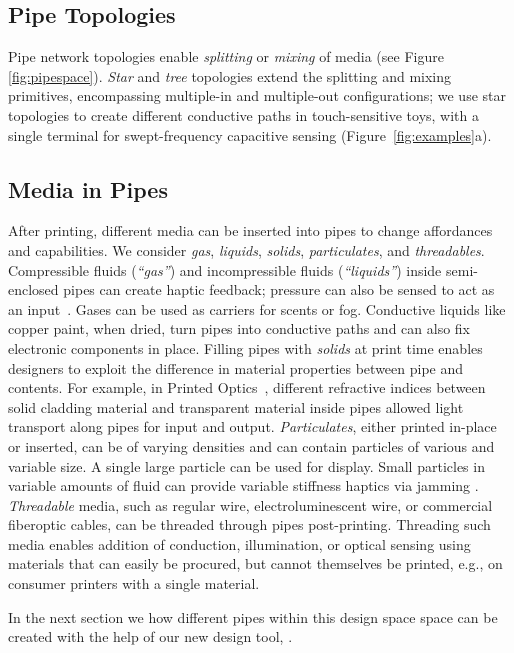 \subsection{Pipe Topologies}
Pipe network topologies enable \emph{splitting} or \emph{mixing} of media (see Figure \ref{fig:pipespace}).  \emph{Star} and \emph{tree} topologies extend the splitting and mixing primitives, encompassing multiple-in and multiple-out configurations; we use star topologies to create different conductive paths in touch-sensitive toys, with a single terminal for swept-frequency capacitive sensing (Figure~\ref{fig:examples}a).

\subsection{Media in Pipes}
After printing, different media can be inserted into pipes to change affordances and capabilities. We consider \emph{gas}, \emph{liquids}, \emph{solids}, \emph{particulates}, and \emph{threadables}. 
%
Compressible fluids (\emph{``gas''}) and incompressible fluids (\emph{``liquids''})  inside semi-enclosed pipes can create haptic feedback; pressure can also be sensed to act as an input~\cite{Slyper-shape}. Gases can be used as carriers for scents or fog. Conductive liquids like copper paint, when dried, turn pipes into conductive paths and can also fix electronic components in place.
%
Filling pipes with \emph{solids} at print time enables designers to exploit the difference in material properties between pipe and contents. For example, in Printed Optics~\cite{Willis-printedoptics}, different refractive indices between solid cladding material and transparent material inside pipes allowed light transport along pipes for input and output.
%
\emph{Particulates}, either printed in-place or inserted, can be of varying densities and can contain particles of various and variable size.  A single large particle can be used for display.  Small particles in variable amounts of fluid can provide variable stiffness haptics via jamming \cite{Follmer-jamming}.
%
\emph{Threadable} media, such as regular wire, electroluminescent wire, or commercial fiberoptic cables, can be threaded through pipes post-printing. Threading such media enables addition of conduction, illumination, or optical sensing using materials that can easily be procured, but cannot themselves be printed, e.g., on consumer printers with a single material. 

In the next section we how different pipes within this design space space can be created with the help of our new design tool, \systemnamenospace.
